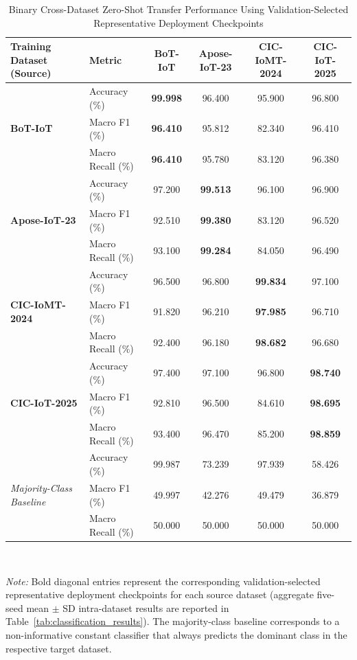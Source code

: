 \documentclass[a4paper,fleqn]{cas-sc}
\begin{document}
\begin{table}[h]
\centering
\caption{Binary Cross-Dataset Zero-Shot Transfer Performance Using Validation-Selected Representative Deployment Checkpoints}
\label{tab:cross_dataset}
\begin{tabular}{llcccc}
\toprule
\textbf{Training Dataset (Source)} & \textbf{Metric} & \textbf{BoT-IoT} & \textbf{Apose-IoT-23} & \textbf{CIC-IoMT-2024} & \textbf{CIC-IoT-2025} \\
\midrule
\multirow{3}{*}{\textbf{BoT-IoT}} & Accuracy (\%) & \textbf{99.998} & 96.400 & 95.900 & 96.800 \\
 & Macro F1 (\%) & \textbf{96.410} & 95.812 & 82.340 & 96.410 \\
 & Macro Recall (\%) & \textbf{96.410} & 95.780 & 83.120 & 96.380 \\
\cline{1-6}
\multirow{3}{*}{\textbf{Apose-IoT-23}} & Accuracy (\%) & 97.200 & \textbf{99.513} & 96.100 & 96.900 \\
 & Macro F1 (\%) & 92.510 & \textbf{99.380} & 83.120 & 96.520 \\
 & Macro Recall (\%) & 93.100 & \textbf{99.284} & 84.050 & 96.490 \\
\cline{1-6}
\multirow{3}{*}{\textbf{CIC-IoMT-2024}} & Accuracy (\%) & 96.500 & 96.800 & \textbf{99.834} & 97.100 \\
 & Macro F1 (\%) & 91.820 & 96.210 & \textbf{97.985} & 96.710 \\
 & Macro Recall (\%) & 92.400 & 96.180 & \textbf{98.682} & 96.680 \\
\cline{1-6}
\multirow{3}{*}{\textbf{CIC-IoT-2025}} & Accuracy (\%) & 97.400 & 97.100 & 96.800 & \textbf{98.740} \\
 & Macro F1 (\%) & 92.810 & 96.500 & 84.610 & \textbf{98.695} \\
 & Macro Recall (\%) & 93.400 & 96.470 & 85.200 & \textbf{98.859} \\
\midrule
\multirow{3}{*}{\textit{Majority-Class Baseline}} & Accuracy (\%) & 99.987 & 73.239 & 97.939 & 58.426 \\
 & Macro F1 (\%) & 49.997 & 42.276 & 49.479 & 36.879 \\
 & Macro Recall (\%) & 50.000 & 50.000 & 50.000 & 50.000 \\
\bottomrule
\end{tabular}
\\[1.5ex]
\parbox{\linewidth}{\footnotesize \textit{Note:} Bold diagonal entries represent the corresponding validation-selected representative deployment checkpoints for each source dataset ({\color{blue}aggregate five-seed mean $\pm$ SD intra-dataset results are reported in Table~\ref{tab:classification_results}}). The majority-class baseline corresponds to a non-informative constant classifier that always predicts the dominant class in the respective target dataset.}
\end{table}
\end{document}
